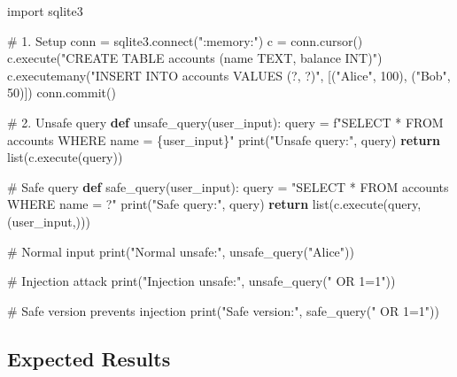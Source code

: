 \documentclass[
  letterpaper,
  DIV=11,
  numbers=noendperiod]{scrreprt}
\newenvironment{Shaded}{\begin{snugshade}}{\end{snugshade}}
\newcommand{\BuiltInTok}[1]{\textcolor[rgb]{0.00,0.23,0.31}{#1}}
\newcommand{\CommentTok}[1]{\textcolor[rgb]{0.37,0.37,0.37}{#1}}
\newcommand{\ControlFlowTok}[1]{\textcolor[rgb]{0.00,0.23,0.31}{\textbf{#1}}}
\newcommand{\DecValTok}[1]{\textcolor[rgb]{0.68,0.00,0.00}{#1}}
\newcommand{\ExtensionTok}[1]{\textcolor[rgb]{0.00,0.23,0.31}{#1}}
\newcommand{\ImportTok}[1]{\textcolor[rgb]{0.00,0.46,0.62}{#1}}
\newcommand{\KeywordTok}[1]{\textcolor[rgb]{0.00,0.23,0.31}{\textbf{#1}}}
\newcommand{\NormalTok}[1]{\textcolor[rgb]{0.00,0.23,0.31}{#1}}
\newcommand{\OperatorTok}[1]{\textcolor[rgb]{0.37,0.37,0.37}{#1}}
\newcommand{\SpecialCharTok}[1]{\textcolor[rgb]{0.37,0.37,0.37}{#1}}
\newcommand{\SpecialStringTok}[1]{\textcolor[rgb]{0.13,0.47,0.30}{#1}}
\newcommand{\StringTok}[1]{\textcolor[rgb]{0.13,0.47,0.30}{#1}}
\begin{document}
\begin{Shaded}
\begin{Highlighting}[]
\ImportTok{import}\NormalTok{ sqlite3}

\CommentTok{\# 1. Setup}
\NormalTok{conn }\OperatorTok{=}\NormalTok{ sqlite3.}\ExtensionTok{connect}\NormalTok{(}\StringTok{":memory:"}\NormalTok{)}
\NormalTok{c }\OperatorTok{=}\NormalTok{ conn.cursor()}
\NormalTok{c.execute(}\StringTok{"CREATE TABLE accounts (name TEXT, balance INT)"}\NormalTok{)}
\NormalTok{c.executemany(}\StringTok{"INSERT INTO accounts VALUES (?, ?)"}\NormalTok{, [(}\StringTok{"Alice"}\NormalTok{, }\DecValTok{100}\NormalTok{), (}\StringTok{"Bob"}\NormalTok{, }\DecValTok{50}\NormalTok{)])}
\NormalTok{conn.commit()}

\CommentTok{\# 2. Unsafe query}
\KeywordTok{def}\NormalTok{ unsafe\_query(user\_input):}
\NormalTok{    query }\OperatorTok{=} \SpecialStringTok{f"SELECT * FROM accounts WHERE name = \textquotesingle{}}\SpecialCharTok{\{}\NormalTok{user\_input}\SpecialCharTok{\}}\SpecialStringTok{\textquotesingle{}"}
    \BuiltInTok{print}\NormalTok{(}\StringTok{"Unsafe query:"}\NormalTok{, query)}
    \ControlFlowTok{return} \BuiltInTok{list}\NormalTok{(c.execute(query))}

\CommentTok{\# Safe query}
\KeywordTok{def}\NormalTok{ safe\_query(user\_input):}
\NormalTok{    query }\OperatorTok{=} \StringTok{"SELECT * FROM accounts WHERE name = ?"}
    \BuiltInTok{print}\NormalTok{(}\StringTok{"Safe query:"}\NormalTok{, query)}
    \ControlFlowTok{return} \BuiltInTok{list}\NormalTok{(c.execute(query, (user\_input,)))}

\CommentTok{\# Normal input}
\BuiltInTok{print}\NormalTok{(}\StringTok{"Normal unsafe:"}\NormalTok{, unsafe\_query(}\StringTok{"Alice"}\NormalTok{))}

\CommentTok{\# Injection attack}
\BuiltInTok{print}\NormalTok{(}\StringTok{"Injection unsafe:"}\NormalTok{, unsafe\_query(}\StringTok{"\textquotesingle{} OR \textquotesingle{}1\textquotesingle{}=\textquotesingle{}1"}\NormalTok{))}

\CommentTok{\# Safe version prevents injection}
\BuiltInTok{print}\NormalTok{(}\StringTok{"Safe version:"}\NormalTok{, safe\_query(}\StringTok{"\textquotesingle{} OR \textquotesingle{}1\textquotesingle{}=\textquotesingle{}1"}\NormalTok{))}
\end{Highlighting}
\end{Shaded}

\subsection{Expected Results}\label{expected-results-14}
\end{document}
